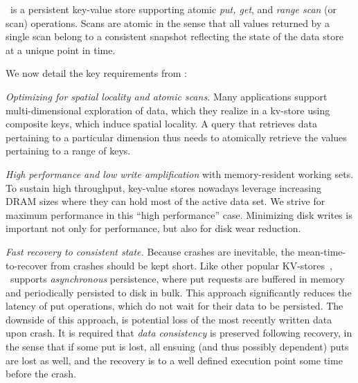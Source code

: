 

\sys\ is a persistent key-value store supporting atomic \emph{put, get}, and  \emph{range scan} (or scan) operations. 
Scans are atomic in the sense that all values returned by a single scan belong to a consistent snapshot reflecting
the state of the data store at a unique point in time.


We now detail the key requirements from \sys:

\emph{Optimizing for spatial locality and atomic scans.}
 Many applications support multi-dimensional exploration of data, 
 which they realize in a kv-store using composite keys, which induce spatial locality.  
A query that retrieves data pertaining to a particular dimension thus needs to atomically 
retrieve the values pertaining to a range of keys. 
 

\emph{High performance and low write amplification} with memory-resident working sets.
To sustain high throughput, key-value stores nowadays leverage increasing DRAM sizes where they can hold most of the 
active data set. We strive for maximum performance in this ``high performance'' case.  
 Minimizing disk writes is important not only for performance, but also for disk wear reduction.

\emph{Fast recovery to consistent state.}
Because crashes are inevitable, the mean-time-to-recover from crashes should be kept short.
Like other popular KV-stores~\cite{RocksDB,leveldb,hbase}, \sys\ supports \emph{asynchronous} persistence, 
where put requests are buffered in memory and periodically persisted to disk in bulk. 
This approach significantly reduces the latency of put operations, which do not wait for their data to be persisted.
The downside of this approach, is potential loss of the most recently written data upon crash. 
It is required that \emph{data consistency} is preserved following recovery, in the sense that 
if some put is lost, all ensuing (and thus possibly dependent) puts are lost as well, and the recovery is to a well 
defined execution point some time before the crash.
 
